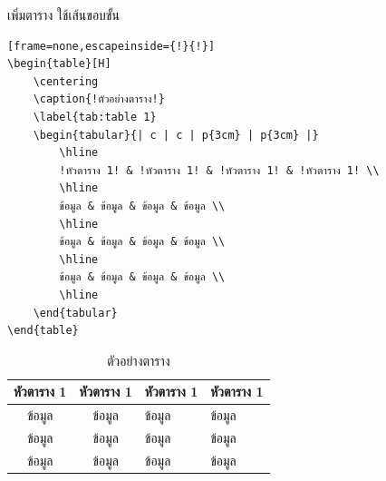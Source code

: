 \begin{exampleBox}{เพิ่มตาราง ใช้เส้นขอบขั้น}
\begin{lstlisting}[frame=none,escapeinside={!}{!}]
\begin{table}[H]
    \centering
    \caption{!ตัวอย่างตาราง!}
    \label{tab:table 1}
    \begin{tabular}{| c | c | p{3cm} | p{3cm} |}
        \hline
        !หัวตาราง 1! & !หัวตาราง 1! & !หัวตาราง 1! & !หัวตาราง 1! \\
        \hline
        ข้อมูล & ข้อมูล & ข้อมูล & ข้อมูล \\
        \hline
        ข้อมูล & ข้อมูล & ข้อมูล & ข้อมูล \\
        \hline
        ข้อมูล & ข้อมูล & ข้อมูล & ข้อมูล \\
        \hline
    \end{tabular}
\end{table}
\end{lstlisting}
\tcblower
\begin{table}[H]
    \centering
    \caption{ตัวอย่างตาราง}
    \label{tab:table 1}
    \begin{tabular}{| c | c | p{3cm} | p{3cm} |}
        \hline
        หัวตาราง 1 & หัวตาราง 1 & หัวตาราง 1 & หัวตาราง 1 \\
        \hline
        ข้อมูล & ข้อมูล & ข้อมูล & ข้อมูล \\
        \hline
        ข้อมูล & ข้อมูล & ข้อมูล & ข้อมูล \\
        \hline
        ข้อมูล & ข้อมูล & ข้อมูล & ข้อมูล \\
        \hline
    \end{tabular}
\end{table}
\end{exampleBox}

